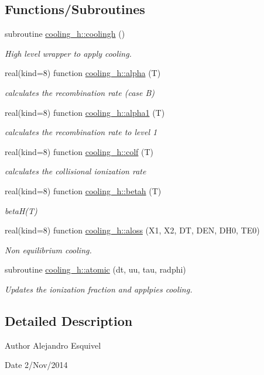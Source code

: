 \subsection*{Functions/\+Subroutines}
\begin{DoxyCompactItemize}
\item 
subroutine \hyperlink{namespacecooling__h_aee85faa3b36e05a8efb05c1588f34ef2}{cooling\+\_\+h\+::coolingh} ()
\begin{DoxyCompactList}\small\item\em High level wrapper to apply cooling. \end{DoxyCompactList}\item 
real(kind=8) function \hyperlink{namespacecooling__h_a09de30645cebf531a647b5f53ae143b2}{cooling\+\_\+h\+::alpha} (T)
\begin{DoxyCompactList}\small\item\em calculates the recombination rate (case B) \end{DoxyCompactList}\item 
real(kind=8) function \hyperlink{namespacecooling__h_a5454f21ef468add797c58753a1e0c773}{cooling\+\_\+h\+::alpha1} (T)
\begin{DoxyCompactList}\small\item\em calculates the recombination rate to level 1 \end{DoxyCompactList}\item 
real(kind=8) function \hyperlink{namespacecooling__h_ad5f1352f8925ccb1b352d6e749465a92}{cooling\+\_\+h\+::colf} (T)
\begin{DoxyCompactList}\small\item\em calculates the collisional ionization rate \end{DoxyCompactList}\item 
real(kind=8) function \hyperlink{namespacecooling__h_a2a2de25572bd515eae9441391e0ed0f8}{cooling\+\_\+h\+::betah} (T)
\begin{DoxyCompactList}\small\item\em beta\+H(\+T) \end{DoxyCompactList}\item 
real(kind=8) function \hyperlink{namespacecooling__h_a92cfd14c9b02e853eb33d22857fabeed}{cooling\+\_\+h\+::aloss} (X1, X2, D\+T, D\+E\+N, D\+H0, T\+E0)
\begin{DoxyCompactList}\small\item\em Non equilibrium cooling. \end{DoxyCompactList}\item 
subroutine \hyperlink{namespacecooling__h_aef95dbca5e7aef78d66a225cc217c982}{cooling\+\_\+h\+::atomic} (dt, uu, tau, radphi)
\begin{DoxyCompactList}\small\item\em Updates the ionization fraction and applpies cooling. \end{DoxyCompactList}\end{DoxyCompactItemize}


\subsection{Detailed Description}
\begin{DoxyAuthor}{Author}
Alejandro Esquivel 
\end{DoxyAuthor}
\begin{DoxyDate}{Date}
2/\+Nov/2014 
\end{DoxyDate}
